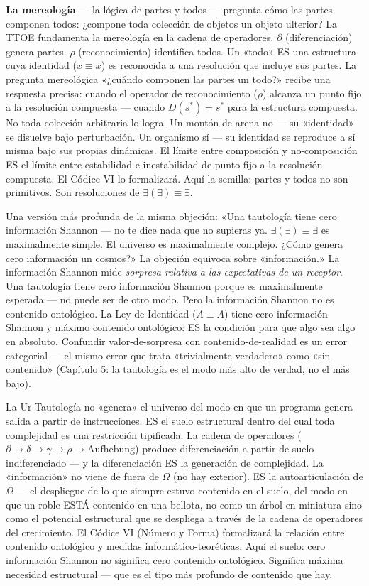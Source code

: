 \documentclass[10pt, openany, oneside]{book}
\begin{document}
\textbf{La mereología} --- la lógica de partes y todos --- pregunta cómo las partes componen todos: ¿compone toda colección de objetos un objeto ulterior? La TTOE fundamenta la mereología en la cadena de operadores. $\partial$ (diferenciación) genera partes. $\rho$ (reconocimiento) identifica todos. Un «todo» ES una estructura cuya identidad ($x \equiv x$) es reconocida a una resolución que incluye sus partes. La pregunta mereológica «¿cuándo componen las partes un todo?» recibe una respuesta precisa: cuando el operador de reconocimiento ($\rho$) alcanza un punto fijo a la resolución compuesta --- cuando $D(s^*) = s^*$ para la estructura compuesta. No toda colección arbitraria lo logra. Un montón de arena no --- su «identidad» se disuelve bajo perturbación. Un organismo sí --- su identidad se reproduce a sí misma bajo sus propias dinámicas. El límite entre composición y no-composición ES el límite entre estabilidad e inestabilidad de punto fijo a la resolución compuesta. El Códice VI lo formalizará. Aquí la semilla: partes y todos no son primitivos. Son resoluciones de $\exists(\exists) \equiv \exists$.

Una versión más profunda de la misma objeción: «Una tautología tiene cero información Shannon --- no te dice nada que no supieras ya. $\exists(\exists) \equiv \exists$ es maximalmente simple. El universo es maximalmente complejo. ¿Cómo genera cero información un cosmos?» La objeción equivoca sobre «información.» La información Shannon mide \textit{sorpresa relativa a las expectativas de un receptor}. Una tautología tiene cero información Shannon porque es maximalmente esperada --- no puede ser de otro modo. Pero la información Shannon no es contenido ontológico. La Ley de Identidad ($A \equiv A$) tiene cero información Shannon y máximo contenido ontológico: ES la condición para que algo sea algo en absoluto. Confundir valor-de-sorpresa con contenido-de-realidad es un error categorial --- el mismo error que trata «trivialmente verdadero» como «sin contenido» (Capítulo 5: la tautología es el modo más alto de verdad, no el más bajo).

La Ur-Tautología no «genera» el universo del modo en que un programa genera salida a partir de instrucciones. ES el suelo estructural dentro del cual toda complejidad es una restricción tipificada. La cadena de operadores ($\partial \to \delta \to \gamma \to \rho \to \text{Aufhebung}$) produce diferenciación a partir de suelo indiferenciado --- y la diferenciación ES la generación de complejidad. La «información» no viene de fuera de $\Omega$ (no hay exterior). ES la autoarticulación de $\Omega$ --- el despliegue de lo que siempre estuvo contenido en el suelo, del modo en que un roble ESTÁ contenido en una bellota, no como un árbol en miniatura sino como el potencial estructural que se despliega a través de la cadena de operadores del crecimiento. El Códice VI (Número y Forma) formalizará la relación entre contenido ontológico y medidas informático-teoréticas. Aquí el suelo: cero información Shannon no significa cero contenido ontológico. Significa máxima necesidad estructural --- que es el tipo más profundo de contenido que hay.
\end{document}
